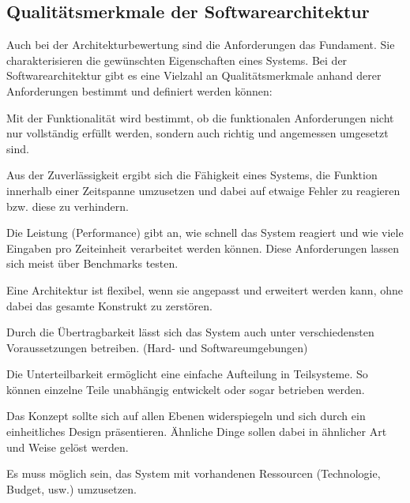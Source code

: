 \subsection{Qualitätsmerkmale der Softwarearchitektur}

Auch bei der Architekturbewertung sind die Anforderungen das Fundament. Sie charakterisieren die 
gewünschten Eigenschaften eines Systems\cite{Starke2015}.
Bei der Softwarearchitektur gibt es eine Vielzahl an Qualitätsmerkmale anhand derer Anforderungen bestimmt und definiert werden können\cites{Starke2015}{Clements2000}:

\begin{description}[leftmargin=!,labelwidth=\widthof{\bfseries Konzeptuelle Integrität}]
	\item[Funktionalität] 
	Mit der Funktionalität wird bestimmt, ob die funktionalen Anforderungen nicht nur vollständig erfüllt werden, sondern auch richtig und angemessen umgesetzt sind.
	\item[Zuverlässigkeit] 
	Aus der Zuverlässigkeit ergibt sich die Fähigkeit eines Systems, die Funktion innerhalb einer Zeitspanne umzusetzen und
	dabei auf etwaige Fehler zu reagieren bzw. diese zu verhindern.
	\item[Leistung] 
	Die Leistung (Performance) gibt an, wie schnell das System reagiert und wie viele Eingaben pro Zeiteinheit verarbeitet werden können. Diese Anforderungen
	lassen sich meist über Benchmarks testen.
	\item[Flexibilität] 
	Eine Architektur ist flexibel, wenn sie angepasst und erweitert werden kann, ohne dabei das gesamte Konstrukt zu zerstören.
	\item[Übertragbarkeit] 
	Durch die Übertragbarkeit lässt sich das System auch unter verschiedensten Voraussetzungen betreiben. (Hard- und Softwareumgebungen) 
	\item[Unterteilbarkeit]
	Die Unterteilbarkeit ermöglicht eine einfache Aufteilung in Teilsysteme. So können einzelne Teile unabhängig entwickelt oder sogar betrieben werden.
	\item[Konzeptuelle Integrität] 
	Das Konzept sollte sich auf allen Ebenen widerspiegeln und sich durch ein einheitliches Design präsentieren. Ähnliche Dinge sollen dabei in ähnlicher Art und Weise gelöst werden. 
	\item[Machbarkeit] 
	Es muss möglich sein, das System mit vorhandenen Ressourcen (Technologie, Budget, usw.) umzusetzen.
\end{description}

